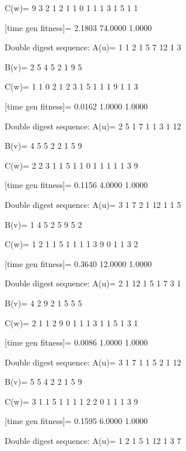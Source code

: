 C(w)=
     9     3     2     1     2     1     1     0     1     1     1     3     1     5     1     1

[time gen fitness]=
    2.1803   74.0000    1.0000

Double digest sequence:
A(u)=
     1     1     2     1     5     7    12     1     3

B(v)=
     2     5     4     5     2     1     9     5

C(w)=
     1     1     0     2     1     2     3     1     5     1     1     1     9     1     1     3

[time gen fitness]=
    0.0162    1.0000    1.0000

Double digest sequence:
A(u)=
     2     5     1     7     1     1     3     1    12

B(v)=
     4     5     5     2     2     1     5     9

C(w)=
     2     2     3     1     1     5     1     1     0     1     1     1     1     1     3     9

[time gen fitness]=
    0.1156    4.0000    1.0000

Double digest sequence:
A(u)=
     3     1     7     2     1    12     1     1     5

B(v)=
     1     4     5     2     5     9     5     2

C(w)=
     1     2     1     1     5     1     1     1     1     3     9     0     1     1     3     2

[time gen fitness]=
    0.3640   12.0000    1.0000

Double digest sequence:
A(u)=
     2     1    12     1     5     1     7     3     1

B(v)=
     4     2     9     2     1     5     5     5

C(w)=
     2     1     1     2     9     0     1     1     1     3     1     1     5     1     3     1

[time gen fitness]=
    0.0086    1.0000    1.0000

Double digest sequence:
A(u)=
     3     1     7     1     1     5     2     1    12

B(v)=
     5     5     4     2     2     1     5     9

C(w)=
     3     1     1     5     1     1     1     1     2     2     0     1     1     1     3     9

[time gen fitness]=
    0.1595    6.0000    1.0000

Double digest sequence:
A(u)=
     1     2     1     5     1    12     1     3     7

